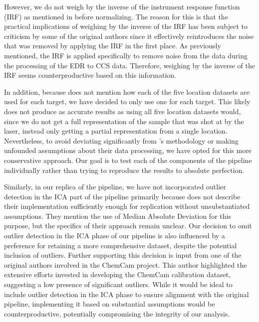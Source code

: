 However, we do not weigh by the inverse of the instrument response function (IRF) as mentioned in \citeauthor{cleggRecalibrationMarsScience2017} before normalizing.
The reason for this is that the practical implications of weighing by the inverse of the IRF has been subject to criticism by some of the original authors since it effectively reintroduces the noise that was removed by applying the IRF in the first place.
As previously mentioned, the IRF is applied specifically to remove noise from the data during the processing of the EDR to CCS data.
Therefore, weighing by the inverse of the IRF seems counterproductive based on this information.

In addition, because \citeauthor{cleggRecalibrationMarsScience2017} does not mention how each of the five location datasets are used for each target, we have decided to only use one for each target.
This likely does not produce as accurate results as using all five location datasets would, since we do not get a full representation of the sample that was shot at by the laser, instead only getting a partial representation from a single location.
Nevertheless, to avoid deviating significantly from \citeauthor{cleggRecalibrationMarsScience2017}'s methodology or making unfounded assumptions about their data processing, we have opted for this more conservative approach.
Our goal is to test each of the components of the pipeline individually rather than trying to reproduce the results to absolute perfection.

Similarly, in our replica of the pipeline, we have not incorporated outlier detection in the ICA part of the pipeline primarily because \citeauthor{cleggRecalibrationMarsScience2017} does not describe their implementation sufficiently enough for replication without unsubstantiated assumptions.
They mention the use of Median Absolute Deviation for this purpose, but the specifics of their approach remain unclear.
Our decision to omit outlier detection in the ICA phase of our pipeline is also influenced by a preference for retaining a more comprehensive dataset, despite the potential inclusion of outliers.
Further supporting this decision is input from one of the original authors involved in the ChemCam project.
This author highlighted the extensive efforts invested in developing the ChemCam calibration dataset, suggesting a low presence of significant outliers.
While it would be ideal to include outlier detection in the ICA phase to ensure alignment with the original pipeline, implementing it based on substantial assumptions would be counterproductive, potentially compromising the integrity of our analysis.

